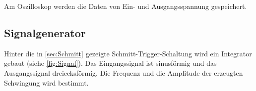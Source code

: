 Am Oszilloskop werden die Daten von Ein- und Ausgangsspannung gespeichert.



\subsection{Signalgenerator}
Hinter die in \autoref{sec:Schmitt} gezeigte Schmitt-Trigger-Schaltung wird ein Integrator gebaut (siehe \autoref{fig:Signal}). Das Eingangssignal ist sinusförmig und das Ausgangssignal dreiecksförmig. Die Frequenz und die Amplitude der erzeugten Schwingung wird bestimmt. 






